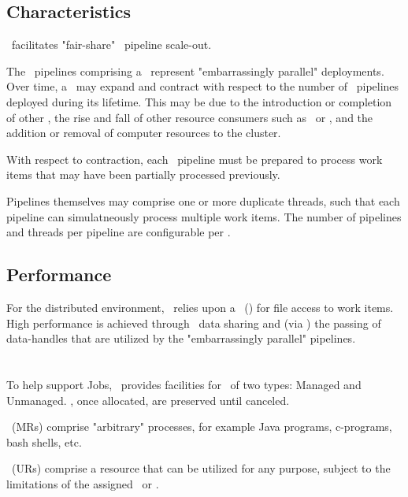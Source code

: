     \subsection{Characteristics}   
    
    \varDUCC~facilitates "fair-share" \varUIMA~pipeline scale-out.
    
    The \varUIMA~pipelines comprising a \varJob~represent "embarrassingly parallel" 
    deployments. Over time, a \varJob~may expand and contract with respect to the number of 
    \varUIMA~pipelines deployed during its lifetime. This may be due to the introduction 
    or completion of other \varJobs, the rise and fall of other resource consumers such 
    as \varReservations~or \varServices, and the addition or removal of computer resources 
    to the cluster.
    
    With respect to contraction, each \varUIMA~pipeline must be prepared to
    process work items that may have been partially processed previously.
   
    Pipelines themselves may comprise one or more duplicate threads, such that each
    pipeline can simulatneously process multiple work items.
    The number of pipelines and threads per pipeline are configurable per \varJob.
   
    \subsection{Performance}  
    
    For the distributed environment, \varDUCC~relies upon a \varNetworkFileSystem~(\varNFS)
    for file access to work items.
    High performance is achieved through \varNFS~data sharing and (via \varActiveMQ) the passing of
    data-handles that are utilized by the "embarrassingly parallel" pipelines.
    
    \section{\varReservations}
    
    To help support Jobs, \varDUCC~provides facilities for \varReservations~of two types: 
    Managed and Unmanaged. \varReservations, once allocated, are preserved until 
    canceled. 
    
    \varManagedReservations~(MRs) comprise "arbitrary" processes, for example Java
    programs, c-programs, bash shells, etc.
    
    \varUnmanagedReservations~(URs) comprise a resource that can be utilized for any 
    purpose, subject to the limitations of the assigned \varShare~or \varShares.
            
